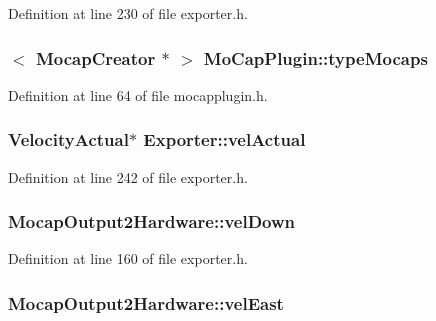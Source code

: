 Definition at line 230 of file exporter.\-h.

\hypertarget{group___mo_cap_plugin_gaca68fd324d804c3124d7ba64b5d0294a}{
\subsubsection[{type\-Mocaps}]{$<$ {\bf Mocap\-Creator} $\ast$ $>$ Mo\-Cap\-Plugin\-::type\-Mocaps\hspace{0.3cm}{\ttfamily [static]}}}\label{group___mo_cap_plugin_gaca68fd324d804c3124d7ba64b5d0294a}


Definition at line 64 of file mocapplugin.\-h.

\hypertarget{group___mo_cap_plugin_gaf7dc7b4cb9c561edf9c8df28131eeac3}{
\subsubsection[{vel\-Actual}]{\setlength{\rightskip}{0pt plus 5cm}Velocity\-Actual$\ast$ Exporter\-::vel\-Actual\hspace{0.3cm}{\ttfamily [protected]}}}\label{group___mo_cap_plugin_gaf7dc7b4cb9c561edf9c8df28131eeac3}


Definition at line 242 of file exporter.\-h.

\hypertarget{group___mo_cap_plugin_ga2ffad0e2c72a914bb6f9ff031aeb9b79}{
\subsubsection[{vel\-Down}]{ Mocap\-Output2\-Hardware\-::vel\-Down}}\label{group___mo_cap_plugin_ga2ffad0e2c72a914bb6f9ff031aeb9b79}


Definition at line 160 of file exporter.\-h.

\hypertarget{group___mo_cap_plugin_gaa2d1409fe871a4dd45265e2412d53f67}{
\subsubsection[{vel\-East}]{ Mocap\-Output2\-Hardware\-::vel\-East}}\label{group___mo_cap_plugin_gaa2d1409fe871a4dd45265e2412d53f67}


